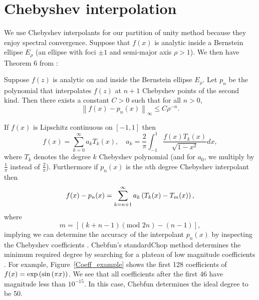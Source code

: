 \section{Chebyshev interpolation}
\label{sec_cheb}
We use Chebyshev interpolants for our partition of unity method because they enjoy spectral convergence. Suppose that $f(x)$ is analytic inside a  Bernstein ellipse $E_\rho$ (an ellipse with foci $\pm 1$ and semi-major axis $\rho>1$). We then have Theorem 6 from \cite{trefethen2000spectral}:
\begin{thm} Suppose $f(z)$ is analytic on and inside the Bernstein ellipse $E_\rho$. Let $p_n$ be the polynomial that interpolates $f(z)$ at $n+1$ Chebyshev points of the second kind. Then there exists a constant $C>0$ such that for all $n>0$,
$$ \left \| f(x)-p_n(x) \right \|_{\infty} \leq C  \rho^{-n}.$$
 \end{thm}
If $f(x)$ is Lipschitz continuous on $[-1,1]$ then
\begin{equation}
f(x) = \sum_{k=0}^\infty a_k T_k(x), \quad a_k = \frac{2}{\pi} \int_{-1}^1 \frac{f(x) T_k(x)}{\sqrt{1-x^2}} dx,
\end{equation}
where $T_k$ denotes the degree $k$ Chebyshev polynomial (and for $a_0$, we multiply by $\frac{1}{\pi}$ instead of $\frac{2}{\pi}$). Furthermore if $p_n(x)$ is the $n$th degree Chebyshev interpolant then
\begin{equation}
f(x)-p_n(x) = \sum_{k=n+1}^{\infty} a_k \left( T_k(x)-T_m(x)\right),
\end{equation}
where
\begin{equation}
m = \left [ (k+n-1)(\text{mod }2n) - (n-1)\right ],
\end{equation}
implying we can determine the accuracy of the interpolant $p_n(x)$ by inspecting the Chebyshev coefficients \cite{Trefethen2013}. Chebfun's standardChop method determines the minimum required degree by searching for a plateau of low magnitude coefficients \cite{Aurentz:2017:CCS:3034774.2998442}.  For example, Figure~\ref{Coeff_example} shows the first 128 coefficients of $f(x)=\exp \left( \sin \left( \pi x \right) \right)$. We see that all coefficients after the first 46 have magnitude less than $10^{-15}$. In this case, Chebfun determines the ideal degree to be 50.

